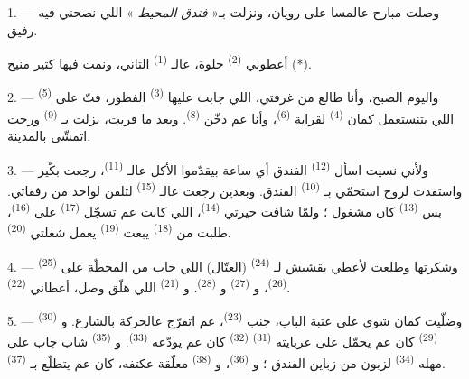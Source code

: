 
\VUsaut{3.0mm}
\VUsaut{1.6mm}
\VUsaut{2.0mm}
\VUsaut{3.4mm}

1. --- وصلت مبارح عالمسا على رويان، ونزلت بـ« \textit{فندق المحيط} »
اللي نصحني فيه رفيق.

أعطوني  \textsuperscript{(2)} حلوة، عالـ
\textsuperscript{(1)} التاني، ونمت فيها كتير منيح (*).

2. --- واليوم الصبح، وأنا طالع من غرفتي، اللي جابت عليها
 \textsuperscript{(3)} الفطور، فتّ على  \textsuperscript{(5)} اللي بتنستعمل كمان 
\textsuperscript{(4)} لقراية  \textsuperscript{(6)}، وأنا
عم دخّن  \textsuperscript{(8)}. وبعد ما قريت، نزلت
بـ \textsuperscript{(9)} ورحت اتمشّى بالمدينة.

3. --- ولأني نسيت اسأل  \textsuperscript{(12)} الفندق أي
ساعة بيقدّموا الأكل عالـ \textsuperscript{(11)}،
رجعت بكّير واستفدت لروح استحمّي بـ \textsuperscript{(10)}
الفندق. وبعدين رجعت عالـ \textsuperscript{(15)} لتلفن
لواحد من رفقاتي. بس  \textsuperscript{(13)} كان مشغول ؛
ولمّا شافت حيرتي  \textsuperscript{(14)}، اللي كانت عم
تسجّل  \textsuperscript{(17)} على 
\textsuperscript{(16)}، طلبت من  \textsuperscript{(18)}
يبعت  \textsuperscript{(19)} يعمل شغلتي
 \textsuperscript{(20)}.

4. --- وشكرتها وطلعت لأعطي بقشيش لـ
\textsuperscript{(24)} (العتّال) اللي جاب من المحطّة على
 \textsuperscript{(25)} 
\textsuperscript{(26)}، و \textsuperscript{(27)}
و \textsuperscript{(28)}. و
\textsuperscript{(21)} اللي هلّق وصل، أعطاني 
\textsuperscript{(22)}.

5. --- وضلّيت كمان شوي على عتبة الباب، جنب 
\textsuperscript{(23)}، عم اتفرّج عالحركة بالشارع. و
\textsuperscript{(30)}  \textsuperscript{(29)} كان عم
يحمّل على عربايته  \textsuperscript{(31)}
 \textsuperscript{(32)} كان عم يودّعه  \textsuperscript{(33)}. و
\textsuperscript{(35)} شاب جاب على مهله 
\textsuperscript{(34)} لزبون من زباين الفندق ؛ و
\textsuperscript{(36)}، و \textsuperscript{(38)} معلّقة
عكتفه، كان عم يتطلّع بـ \textsuperscript{(37)}.

